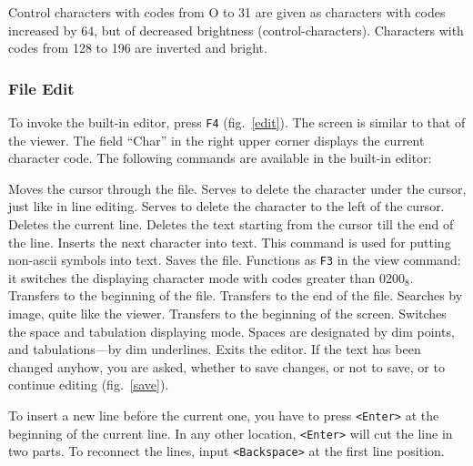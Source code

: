 
Control characters with codes from O to 31 are given as characters with codes
increased by 64, but of decreased brightness (control-characters).
Characters with codes from 128 to 196 are inverted and bright.


\subsubsection{File Edit}

To invoke the built-in editor, press {\tt F4} (fig.~\ref{edit}).
The screen is similar to that of the viewer. The field ``Char''
in the right upper corner displays the current character code.
The following commands are available in the built-in editor:

\begin{example}
\litem{$\uparrow$ $\downarrow$ $\leftarrow$ $\rightarrow$}
Moves the cursor through the file.
Serves to delete the character under the cursor, just like in line editing.
Serves to delete the character to the left of the cursor.
Deletes the current line.
Deletes the text starting from the cursor till the end of the line.
Inserts the next character into text. This command is used for
putting non-ascii symbols into text.
Saves the file. 
Functions as {\tt F3} in the view command: it switches the displaying
character mode with codes greater than 0200${}_8$.
Transfers to the beginning of the file.
Transfers to the end of the file.
Searches by image, quite like the viewer.
Transfers to the beginning of the screen.
Switches the space and tabulation displaying mode. Spaces are
designated by dim points, and tabulations---by dim underlines.
Exits the editor. If the text has been changed anyhow, you are asked,
whether to save changes, or not to save, or to continue editing
(fig.~\ref{save}).
\end{example}


To insert a new line before the current one, you have to 
press {\tt <Enter>} at the beginning of the current line. In
any other location, {\tt <Enter>} will cut the line in two parts.
To reconnect the lines, input {\tt <Backspace>} at the first
line position.

